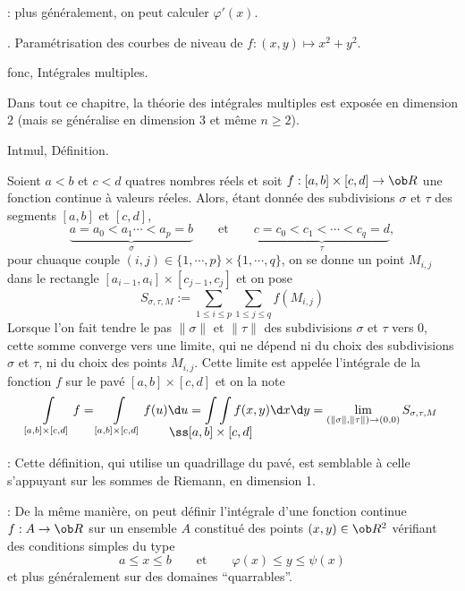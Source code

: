 \Remarque : plus g\'en\'eralement, on peut calculer $\varphi'(x)$. 
\bigskip

\Exemple.  Param\'etrisation des courbes de niveau de $f:(x,y)\mapsto x^2+y^2$. 






\pagetitretrue


\Chapter fonc, Int\'egrales multiples. 
\bigskip

Dans tout ce chapitre, la th\'eorie des int\'egrales multiples est expos\'ee en dimension $2$ (mais se g\'en\'eralise en dimension $3$ et m\^eme $n\ge2$). 
\bigskip

\Section Intmul, D\'efinition. 

\Definition []  Soient $a< b$ et $c< d$ quatres nombres r\'eels et soit $f:[a,b]\times[c,d]\to\ob R$ une fonction continue \`a valeurs r\'eeles. Alors, \'etant donn\'ee des 
subdivisions $\sigma$ et $\tau$ des segments $[a,b]$ et $[c,d]$, 
$$
\underbrace{a=a_0< a_1\cdots< a_p=b}_{\sigma}\qquad \mbox{et}\qquad \underbrace{c=c_0< c_1< \cdots< c_q=d}_{\tau},
$$
pour chuaque couple $(i,j)\in\{1,\cdots,p\}\times\{1,\cdots,q\}$, on se donne un point $M_{i,j}$ dans le rectangle $[a_{i-1},a_i]\times[c_{j-1},c_j]$ et on pose 
$$
S_{\sigma,\tau,M}:=\sum_{1\le i\le p}\sum_{1\le j\le q}f(M_{i,j})
$$
Lorsque l'on fait tendre le pas $\|\sigma\|$ et $\|\tau\|$ des subdivisions $\sigma$ et $\tau$ vers $0$, cette somme converge vers une limite, qui ne d\'epend ni du choix des subdivisions $\sigma$ et $\tau$, ni du choix des points $M_{i,j}$. Cette limite est appel\'ee l'int\'egrale de la fonction $f$ sur le pav\'e $[a,b]\times[c,d]$ et on la note
$$
\int\limits_{[a,b]\times[c,d]}f=\int\limits_{[a,b]\times[c,d]}f(u)\d u=\int\int\limits_{\llap{$\ss[a,b]\times[c,d]$}}f(x,y)\d x\d y =\lim_{(\|\sigma\|,\|\tau\|)\to(0,0)}S_{\sigma,\tau,M}
$$

 : Cette d\'efinition, qui utilise un quadrillage du pav\'e, est semblable \`a celle s'appuyant sur les sommes de Riemann, en dimension 1.
\bigskip

 : De la m\^eme mani\`ere, on peut d\'efinir l'int\'egrale d'une fonction continue $f:A\to\ob R$ 
sur un ensemble $A$ constitu\'e des points $(x,y)\in\ob R^2$ v\'erifiant 
des conditions simples du type 
$$
a\le x\le b\qquad \mbox{et}\qquad \varphi(x)\le y\le \psi(x)
$$
et plus g\'en\'eralement sur des domaines ``quarrables''. 
\bigskip

